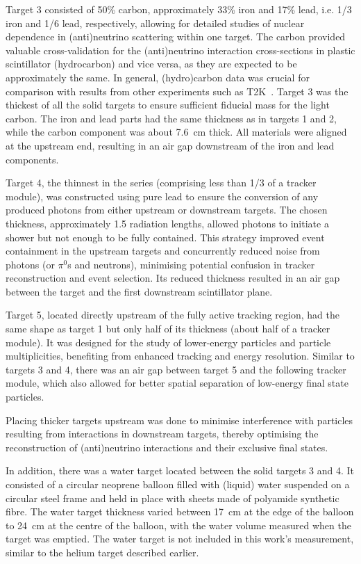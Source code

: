 Target 3 consisted of 50\% carbon, approximately 33\% iron and 17\% lead, i.e. 1/3 iron and 1/6 lead, respectively, allowing for detailed studies of nuclear dependence in (anti)neutrino scattering within one target. The carbon provided valuable cross-validation for the (anti)neutrino interaction cross-sections in plastic scintillator (hydrocarbon) and vice versa, as they are expected to be approximately the same. In general, (hydro)carbon data was crucial for comparison with results from other experiments such as T2K~\cite{t2k_ABE2011106}. Target 3 was the thickest of all the solid targets to ensure sufficient fiducial mass for the light carbon. The iron and lead parts had the same thickness as in targets 1 and 2, while the carbon component was about 7.6~cm thick. All materials were aligned at the upstream end, resulting in an air gap downstream of the iron and lead components. 

Target 4, the thinnest in the series (comprising less than 1/3 of a tracker module), was constructed using pure lead to ensure the conversion of any produced photons from either upstream or downstream targets. The chosen thickness, approximately 1.5 radiation lengths, allowed photons to initiate a shower but not enough to be fully contained. This strategy improved event containment in the upstream targets and concurrently reduced noise from photons (or $\pi^0$s and neutrons), minimising potential confusion in tracker reconstruction and event selection. Its reduced thickness resulted in an air gap between the target and the first downstream scintillator plane. 

Target 5, located directly upstream of the fully active tracking region, had the same shape as target 1 but only half of its thickness (about half of a tracker module). It was designed for the study of lower-energy particles and particle multiplicities, benefiting from enhanced tracking and energy resolution. Similar to targets 3 and 4, there was an air gap between target 5 and the following tracker module, which also allowed for better spatial separation of low-energy final state particles. 

Placing thicker targets upstream was done to minimise interference with particles resulting from interactions in downstream targets, thereby optimising the reconstruction of (anti)neutrino interactions and their exclusive final states.

In addition, there was a water target located between the solid targets 3 and 4. It consisted of a circular neoprene balloon filled with (liquid) water suspended on a circular steel frame and held in place with sheets made of polyamide synthetic fibre. The water target thickness varied between 17~cm at the edge of the balloon to 24~cm at the centre of the balloon, with the water volume measured when the target was emptied. The water target is not included in this work's measurement, similar to the helium target described earlier.

